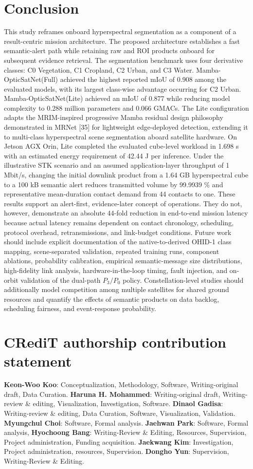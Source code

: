 \documentclass[a4paper,fleqn]{cas-dc}
\begin{document}
\section{Conclusion}
This study reframes onboard hyperspectral segmentation as a component of a result-centric mission architecture. The proposed architecture establishes a fast semantic-alert path while retaining raw and ROI products onboard for subsequent evidence retrieval. The segmentation benchmark uses four derivative classes: C0 Vegetation, C1 Cropland, C2 Urban, and C3 Water.
Mamba-OpticSatNet(Full) achieved the highest reported mIoU of 0.908 among the evaluated models, with its largest class-wise advantage occurring for C2 Urban. Mamba-OpticSatNet(Lite) achieved an mIoU of 0.877 while reducing model complexity to 0.288 million parameters and 0.066 GMACs. The Lite configuration adapts the MRIM-inspired progressive Mamba residual design philosophy demonstrated in MRNet [35] for lightweight edge-deployed detection, extending it to multi-class hyperspectral scene segmentation aboard satellite hardware. On Jetson AGX Orin, Lite completed the evaluated cube-level workload in 1.698 s with an estimated energy requirement of 42.44 J per inference.
Under the illustrative STK scenario and an assumed application-layer throughput of 1 Mbit/s, changing the initial downlink product from a 1.64 GB hyperspectral cube to a 100 kB semantic alert reduces transmitted volume by 99.9939 \% and representative mean-duration contact demand from 44 contacts to one. These results support an alert-first, evidence-later concept of operations. They do not, however, demonstrate an absolute 44-fold reduction in end-to-end mission latency because actual latency remains dependent on contact chronology, scheduling, protocol overhead, retransmissions, and link-budget conditions.
Future work should include explicit documentation of the native-to-derived OHID-1 class mapping, scene-separated validation, repeated training runs, component ablations, probability calibration, empirical semantic-message size distributions, high-fidelity link analysis, hardware-in-the-loop timing, fault injection, and on-orbit validation of the dual-path \(P_3/P_0 \) policy. Constellation-level studies should additionally model competition among multiple satellites for shared ground resources and quantify the effects of semantic products on data backlog, scheduling fairness, and event-response probability.
\section*{CRediT authorship contribution statement}
\textbf{Keon-Woo Koo}: Conceptualization, Methodology, Software, Writing-original draft, Data Curation. \textbf{Haruna H. Mohammed}: Writing-original draft, Writing-review \& editing, Visualization, Investigation, Software. \textbf{Dinaol Gadisa}: Writing-review \& editing, Data Curation, Software, Visualization, Validation. \textbf{Myungchul Choi}: Software, Formal analysis. \textbf{Jaehwan Park}: Software, Formal analysis, \textbf{Hyochoong Bang}: Writing-Review \& Editing, Resources, Supervision, Project administration, Funding acquisition. \textbf{Jaekwang Kim}: Investigation, Project administration, resources, Supervision. \textbf{Dongho Yun}: Supervision, Writing-Review \& Editing.
\end{document}

